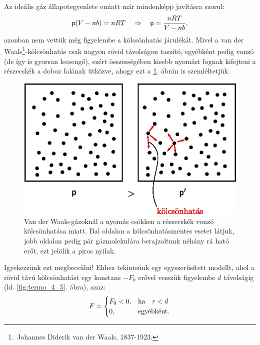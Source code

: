 Az ideális gáz állapotegyenlete emiatt már mindenképp javításra szorul:
\begin{align}\label{eq:vdW_1}
    \mathsf p(V-nb) = nRT \quad\Rightarrow\quad \mathsf p = \frac{nRT}{V-nb},
\end{align}
azonban nem vettük még figyelembe a kölcsönhatás járulékát. Mivel a van der Waals\footnote{\,Johannes Diderik van der Waals, 1837-1923.}-kölcsönhatás csak nagyon rövid távolságon taszító, egyébként pedig vonzó (de így is gyorsan lecsengő), ezért összességében kisebb nyomást fognak kifejteni a részecskék a doboz falának ütközve, ahogy ezt a \ref{fig:termo_4_3}. ábrán is szemléltetjük.
\begin{figure}
    \centering
    \includegraphics{termo_4/termo_4_3.eps}
    \caption{Van der Waals-gázoknál a nyomás csökken a részecskék vonzó kölcsönhatása miatt. Bal oldalon a kölcsönhatásmentes esetet látjuk, jobb oldalon pedig pár gázmolekulára berajzoltunk néhány rá ható erőt, ezt jelölik a piros nyilak.}
    \label{fig:termo_4_3}
\end{figure}
Igyekezzünk ezt megbecsülni! Ehhez tekintsünk egy egyszerűsített modellt, ahol a rövid távú kölcsönhatást egy konstans $-F_0$ erővel vesszük figyelembe $d$ távolságig (ld. \ref{fig:termo_4_5}. ábra), azaz:
\begin{align}
    F =
    \begin{cases}
    F_0<0,&\textnormal{ha}\quad r<d\\
    0,&\textnormal{egyébként}.
    \end{cases}
\end{align}
